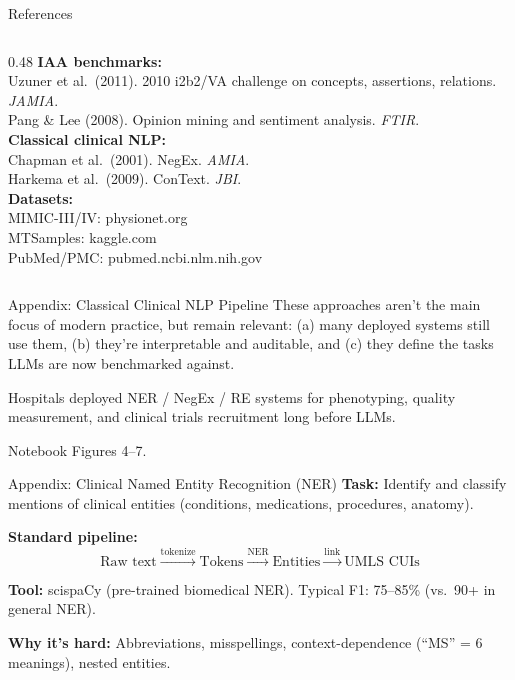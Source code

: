 \documentclass[aspectratio=169,11pt]{beamer}
\begin{document}
\begin{frame}{References}
\begin{columns}[T]
\begin{column}{0.48\textwidth}
\textbf{IAA benchmarks:}\\
Uzuner et al.\ (2011). 2010 i2b2/VA challenge on concepts, assertions, relations. \textit{JAMIA}.\\
Pang \& Lee (2008). Opinion mining and sentiment analysis. \textit{FTIR}.\\[0.2em]

\textbf{Classical clinical NLP:}\\
Chapman et al.\ (2001). NegEx. \textit{AMIA}.\\
Harkema et al.\ (2009). ConText. \textit{JBI}.\\[0.2em]

\textbf{Datasets:}\\
MIMIC-III/IV: physionet.org\\
MTSamples: kaggle.com\\
PubMed/PMC: pubmed.ncbi.nlm.nih.gov\\
\end{column}
\end{columns}
\end{frame}

\appendix

\begin{frame}{Appendix: Classical Clinical NLP Pipeline}
These approaches aren't the main focus of modern practice, but remain relevant: (a) many deployed systems still use them, (b) they're interpretable and auditable, and (c) they define the tasks LLMs are now benchmarked against.

\vspace{0.3em}
Hospitals deployed NER / NegEx / RE systems for phenotyping, quality measurement, and clinical trials recruitment long before LLMs.

\vspace{0.2em}
\alert{Notebook Figures 4--7.}
\end{frame}

\begin{frame}{Appendix: Clinical Named Entity Recognition (NER)}
\textbf{Task:} Identify and classify mentions of clinical entities (conditions, medications, procedures, anatomy).

\vspace{0.3em}
\textbf{Standard pipeline:}
\[
\text{Raw text} \xrightarrow{\text{tokenize}} \text{Tokens} \xrightarrow{\text{NER}} \text{Entities} \xrightarrow{\text{link}} \text{UMLS CUIs}
\]

\vspace{-0.3em}
\textbf{Tool:} scispaCy (pre-trained biomedical NER). Typical F1: 75--85\% (vs.\ 90+ in general NER).

\vspace{0.3em}
\textbf{Why it's hard:} Abbreviations, misspellings, context-dependence (``MS'' = 6 meanings), nested entities.
\end{frame}
\end{document}

